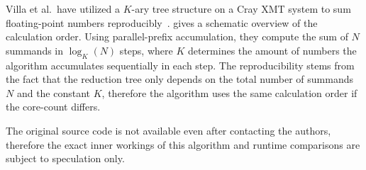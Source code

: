 Villa et al.\ have utilized a $K$-ary tree structure on a Cray XMT system to sum floating-point numbers reproducibly~\cite{villa_effects_2009}.
 gives a schematic overview of the calculation order.
Using parallel-prefix accumulation, they compute the sum of $N$ summands in $\log_K (N)$ steps, where $K$ determines the amount of numbers the algorithm accumulates sequentially in each step.
The reproducibility stems from the fact that the reduction tree only depends on the total number of summands $N$ and the constant $K$, therefore the algorithm uses the same calculation order if the core-count differs.

The original source code is not available even after contacting the authors, therefore the exact inner workings of this algorithm and runtime comparisons are subject to speculation only.
